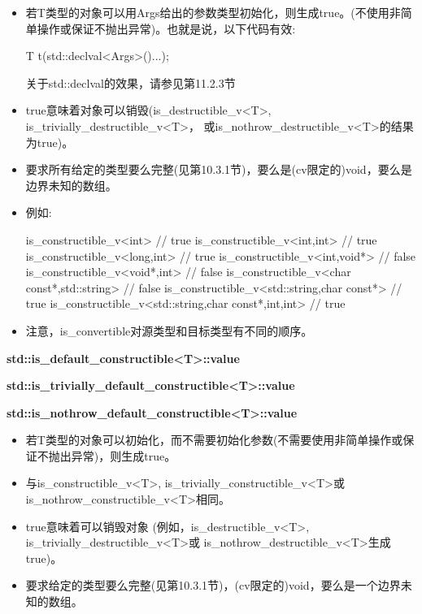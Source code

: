 \begin{itemize}
\item 
若T类型的对象可以用Args给出的参数类型初始化，则生成true。(不使用非简单操作或保证不抛出异常)。也就是说，以下代码有效:

\begin{cpp}
T t(std::declval<Args>()...);
\end{cpp}

\begin{notice}关于std::declval的效果，请参见第11.2.3节
\end{notice}

\item
true意味着对象可以销毁(is\_destructible\_v<T>, is\_trivially\_destructible\_v<T>， 或is\_nothrow\_destructible\_v<T>的结果为true)。

\item
要求所有给定的类型要么完整(见第10.3.1节)，要么是(cv限定的)void，要么是边界未知的数组。

\item
例如:
\begin{cpp}
is_constructible_v<int> // true
is_constructible_v<int,int> // true
is_constructible_v<long,int> // true
is_constructible_v<int,void*> // false
is_constructible_v<void*,int> // false
is_constructible_v<char const*,std::string> // false
is_constructible_v<std::string,char const*> // true
is_constructible_v<std::string,char const*,int,int> // true
\end{cpp}

\item
注意，is\_convertible对源类型和目标类型有不同的顺序。
\end{itemize}

\textbf{std::is\_default\_constructible<T>::value}

\textbf{std::is\_trivially\_default\_constructible<T>::value}

\textbf{std::is\_nothrow\_default\_constructible<T>::value}

\begin{itemize}
\item 
若T类型的对象可以初始化，而不需要初始化参数(不需要使用非简单操作或保证不抛出异常)，则生成true。

\item 
与is\_constructible\_v<T>, is\_trivially\_constructible\_v<T>或 is\_nothrow\_constructible\_v<T>相同。

\item 
true意味着可以销毁对象 (例如，is\_destructible\_v<T>, is\_trivially\_destructible\_v<T>或 is\_nothrow\_destructible\_v<T>生成true)。

\item 
要求给定的类型要么完整(见第10.3.1节)，(cv限定的)void，要么是一个边界未知的数组。
\end{itemize}


